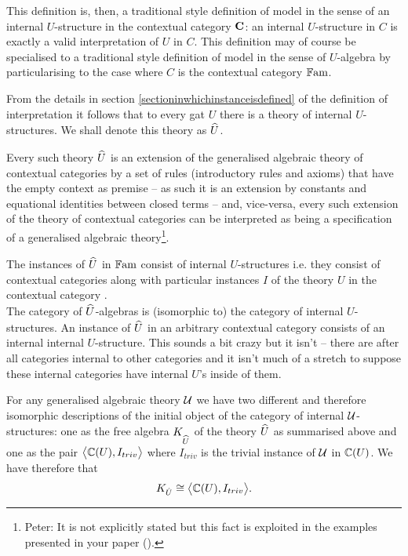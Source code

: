 {\note
This definition is, then, a traditional style definition  of model in the sense of an internal $U$-structure in the contextual category $\catc$:
an internal $U$-structure in $C$ is exactly 
a valid interpretation of $U$ in $C$. This definition may of course be specialised to a traditional style definition of model in the sense of
$U$-algebra by particularising to the case where $C$ is the contextual category $\Fam$.

\note 
From the details  in
section \ref{sectioninwhichinstanceisdefined} 
of the definition of interpretation
it follows that 
to every gat $U$ there is a theory of internal $U$-structures. We shall denote this theory as $\hatU$.

Every such theory $\hatU$ is an extension of the generalised algebraic theory of contextual categories
by a set of rules (introductory rules and axioms) that have  the empty context as premise -- as such it is an extension
by constants and equational identities between closed terms -- and, vice-versa, every such extension of
the theory of contextual categories can be interpreted as being a specification of a generalised algebraic theory\footnote{Peter: It is not explicitly
stated but this fact is exploited in the examples presented in your paper (\cite{BCDEpaper}).}.

\note 
The instances of $\hatU$  in $\Fam$ consist of  internal $U$-structures  i.e. they consist of contextual categories \catcw along with particular instances $I$ of
the theory $U$ in the contextual category \catc. \\
The category of $\hatU$-algebras is (isomorphic to) the category of internal $U$-structures.
\note
An instance of $\hatU$ in an arbitrary contextual category
consists of  an internal internal $U$-structure. This sounds a bit crazy but it isn't -- there are after all categories internal to other categories and it isn't much of a stretch to suppose these internal categories have internal $U$'s inside of them. 

\note
\label{termmodelEQfreealgebra}For any generalised algebraic theory $\gat[U]$ we have two different 
and therefore isomorphic descriptions of the initial object of the category of internal $\gatU$-structures:
one as the free algebra $K_{\hatU}$ of the theory $\hatU$ as summarised above and one  as the pair $\bigtuple{\CofU, I_{triv}}$ 
where $I_{triv}$ is the trivial instance of $\gatU$ in $\CofU$. We have therefore that
\begin{equation}
K_{\hat{U}} \cong \bigtuple{\CofU, I_{triv}}.
\end{equation}

}
